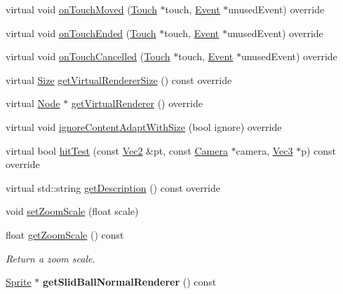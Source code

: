 \begin{DoxyCompactItemize}
\item 
virtual void \hyperlink{classui_1_1Slider_a4641ca08091646358a0e325b5dcd8fb5}{on\+Touch\+Moved} (\hyperlink{classTouch}{Touch} $\ast$touch, \hyperlink{classEvent}{Event} $\ast$unused\+Event) override
\item 
virtual void \hyperlink{classui_1_1Slider_a4729193d3c8dd8d1426f97a4ec13869e}{on\+Touch\+Ended} (\hyperlink{classTouch}{Touch} $\ast$touch, \hyperlink{classEvent}{Event} $\ast$unused\+Event) override
\item 
virtual void \hyperlink{classui_1_1Slider_aa8d68a645ef6e82eb6c48214bd5d8001}{on\+Touch\+Cancelled} (\hyperlink{classTouch}{Touch} $\ast$touch, \hyperlink{classEvent}{Event} $\ast$unused\+Event) override
\item 
virtual \hyperlink{classSize}{Size} \hyperlink{classui_1_1Slider_ab49069835dfbf66b2e5a2e6c99050bf6}{get\+Virtual\+Renderer\+Size} () const override
\item 
virtual \hyperlink{classNode}{Node} $\ast$ \hyperlink{classui_1_1Slider_a72c8715bd62b7eda0e733c66e008c712}{get\+Virtual\+Renderer} () override
\item 
virtual void \hyperlink{classui_1_1Slider_a080562522a4e6fc174fda2cdb6b111af}{ignore\+Content\+Adapt\+With\+Size} (bool ignore) override
\item 
virtual bool \hyperlink{classui_1_1Slider_a2b702f67e7e217bac4c618ed0fe36d7a}{hit\+Test} (const \hyperlink{classVec2}{Vec2} \&pt, const \hyperlink{classCamera}{Camera} $\ast$camera, \hyperlink{classVec3}{Vec3} $\ast$p) const override
\item 
virtual std\+::string \hyperlink{classui_1_1Slider_a064d37cc091783546ed36b4a0b7e4ca5}{get\+Description} () const override
\item 
void \hyperlink{classui_1_1Slider_ac24c9f8e9eb7431468ed0b9606e420b9}{set\+Zoom\+Scale} (float scale)
\item 
float \hyperlink{classui_1_1Slider_abaeae39d3a0da8594d6e3a699c7a3ced}{get\+Zoom\+Scale} () const
\begin{DoxyCompactList}\small\item\em Return a zoom scale. \end{DoxyCompactList}\item 
\mbox{\label{classui_1_1Slider_aaf7dc4d54c0baa9fcf0861aebe831f1f}} 
\hyperlink{classSprite}{Sprite} $\ast$ {\bfseries get\+Slid\+Ball\+Normal\+Renderer} () const
\item 
\mbox{\label{classui_1_1Slider_adee5054c71392f9480c5997cf0e9e6e8}} 

\end{DoxyCompactItemize}
